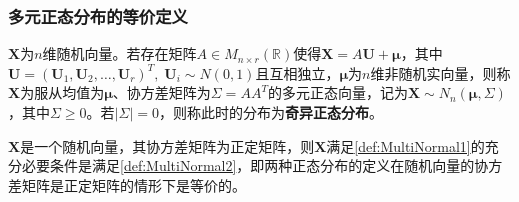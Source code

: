\subsubsection{多元正态分布的等价定义}
\begin{definition}\label{def:MultiNormal2}
	$\mathbf{X}$为$n$维随机向量。若存在矩阵$A\in M_{n\times r}(\mathbb{R})$使得$\mathbf{X}=A\mathbf{U}+\boldsymbol{\mu}$，其中$\mathbf{U}=(\mathbf{U}_1,\mathbf{U}_2,\dots,\mathbf{U}_r)^T,\;\mathbf{U}_i\sim N(0,1)$且互相独立，$\boldsymbol{\mu}$为$n$维非随机实向量，则称$\mathbf{X}$为服从均值为$\boldsymbol{\mu}$、协方差矩阵为$\Sigma=AA^T$的多元正态向量，记为$\mathbf{X}\sim N_n(\boldsymbol{\mu},\Sigma)$，其中$\Sigma\geqslant0$。若$|\Sigma|=0$，则称此时的分布为\textbf{奇异正态分布}。
\end{definition}
\begin{theorem}
	$\mathbf{X}$是一个随机向量，其协方差矩阵为正定矩阵，则$\mathbf{X}$满足\cref{def:MultiNormal1}的充分必要条件是满足\cref{def:MultiNormal2}，即两种正态分布的定义在随机向量的协方差矩阵是正定矩阵的情形下是等价的。
\end{theorem}
